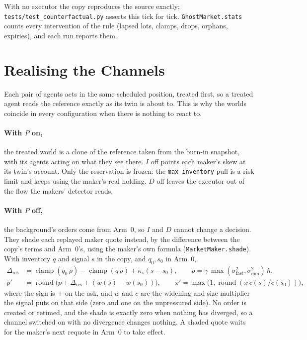 \documentclass[11pt,a4paper]{article}
\newcommand{\code}[1]{\texttt{#1}}
\newcommand{\clamp}{\operatorname{clamp}}
\begin{document}
With no executor the copy reproduces the source exactly; \code{tests/test\_counterfactual.py} asserts this tick for tick.
\code{GhostMarket.stats} counts every intervention of the rule (lapsed lots, clamps, drops, orphans, expiries), and each run
reports them.

\section{Realising the Channels}
\label{sec:lockstep}

Each pair of agents acts in the same scheduled position, treated first, so a treated agent reads the reference exactly as its
twin is about to. This is why the worlds coincide in every configuration when there is nothing to react to.

\paragraph{With $P$ on,} the treated world is a clone of the reference taken from the burn-in snapshot, with its agents acting
on what they see there. $I$ off points each maker's skew at its twin's account. Only the reservation is frozen: the
\code{max\_inventory} pull is a risk limit and keeps using the maker's real holding. $D$ off leaves the executor out of the flow
the makers' detector reads.

\paragraph{With $P$ off,} the background's orders come from Arm~0, so $I$ and $D$ cannot change a decision. They shade each replayed
maker quote instead, by the difference between the copy's terms and Arm~0's, using the maker's own formula
(\code{MarketMaker.shade}). With inventory $q$ and signal $s$ in the copy, and $q_0, s_0$ in Arm~0,
\begin{align*}
  \Delta_{\text{res}} &= \clamp(q_0\,\rho) - \clamp(q\,\rho) + \kappa_s (s - s_0), \qquad \rho = \gamma\,\max(\sigma^2_{\text{fast}}, \sigma^2_{\min})\,h,\\
  p' &= \operatorname{round}\bigl(p + \Delta_{\text{res}} \pm (w(s) - w(s_0))\bigr),\qquad
  x' = \max\bigl(1, \operatorname{round}(x\, c(s) / c(s_0))\bigr),
\end{align*}
where the sign is $+$ on the ask, and $w$ and $c$ are the widening and size multiplier the signal puts on that side (zero and one
on the unpressured side). No order is created or retimed, and the shade is exactly zero when nothing has diverged, so a channel
switched on with no divergence changes nothing. A shaded quote waits for the maker's next requote in Arm~0 to take effect.
\end{document}
